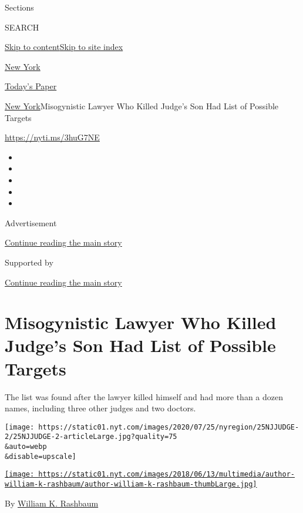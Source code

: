 Sections

SEARCH

\protect\hyperlink{site-content}{Skip to
content}\protect\hyperlink{site-index}{Skip to site index}

\href{https://www.nytimes.com/section/nyregion}{New York}

\href{https://myaccount.nytimes.com/auth/login?response_type=cookie\&client_id=vi}{}

\href{https://www.nytimes.com/section/todayspaper}{Today's Paper}

\href{/section/nyregion}{New York}\textbar{}Misogynistic Lawyer Who
Killed Judge's Son Had List of Possible Targets

\url{https://nyti.ms/3huG7NE}

\begin{itemize}
\item
\item
\item
\item
\item
\end{itemize}

Advertisement

\protect\hyperlink{after-top}{Continue reading the main story}

Supported by

\protect\hyperlink{after-sponsor}{Continue reading the main story}

\hypertarget{misogynistic-lawyer-who-killed-judges-son-had-list-of-possible-targets}{%
\section{Misogynistic Lawyer Who Killed Judge's Son Had List of Possible
Targets}\label{misogynistic-lawyer-who-killed-judges-son-had-list-of-possible-targets}}

The list was found after the lawyer killed himself and had more than a
dozen names, including three other judges and two doctors.

\texttt{[image: https://static01.nyt.com/images/2020/07/25/nyregion/25NJJUDGE-2/25NJJUDGE-2-articleLarge.jpg?quality=75\\\&auto=webp\\\&disable=upscale]}

\href{https://www.nytimes.com/by/william-k-rashbaum}{\texttt{[image: https://static01.nyt.com/images/2018/06/13/multimedia/author-william-k-rashbaum/author-william-k-rashbaum-thumbLarge.jpg]}}

By \href{https://www.nytimes.com/by/william-k-rashbaum}{William K.
Rashbaum}

